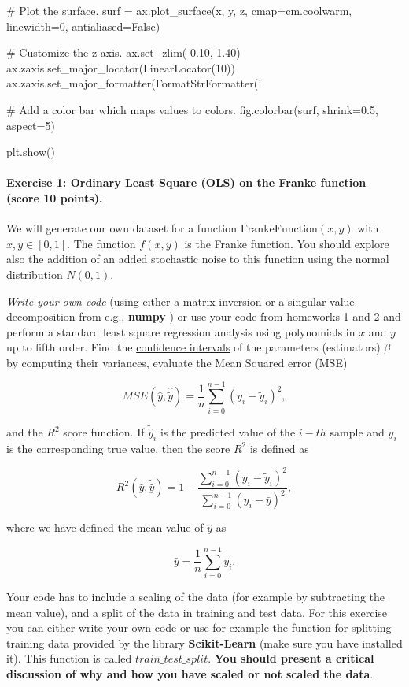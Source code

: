 \documentclass[%
oneside,                 %
final,                   %
10pt]{article}
\begin{document}
# Plot the surface.
surf = ax.plot_surface(x, y, z, cmap=cm.coolwarm,
                       linewidth=0, antialiased=False)

# Customize the z axis.
ax.set_zlim(-0.10, 1.40)
ax.zaxis.set_major_locator(LinearLocator(10))
ax.zaxis.set_major_formatter(FormatStrFormatter('%

# Add a color bar which maps values to colors.
fig.colorbar(surf, shrink=0.5, aspect=5)

plt.show()

\epycod


\paragraph{Exercise 1: Ordinary Least Square (OLS) on the Franke function (score 10 points).}
We will generate our own dataset for a function
$\mathrm{FrankeFunction}(x,y)$ with $x,y \in [0,1]$. The function
$f(x,y)$ is the Franke function. You should explore also the addition
of an added stochastic noise to this function using the normal
distribution $N(0,1)$.

\emph{Write your own code} (using either a matrix inversion or a singular
value decomposition from e.g., \textbf{numpy} ) or use your code from
homeworks 1 and 2 and perform a standard least square regression
analysis using polynomials in $x$ and $y$ up to fifth order. Find the
\href{{https://en.wikipedia.org/wiki/Confidence_interval}}{confidence intervals} of the parameters (estimators) $\beta$ by computing their
variances, evaluate the Mean Squared error (MSE)

\[ MSE(\hat{y},\hat{\tilde{y}}) = \frac{1}{n}
\sum_{i=0}^{n-1}(y_i-\tilde{y}_i)^2, 
\] 

and the $R^2$ score function.  If $\tilde{\hat{y}}_i$ is the predicted
value of the $i-th$ sample and $y_i$ is the corresponding true value,
then the score $R^2$ is defined as

\[
R^2(\hat{y}, \tilde{\hat{y}}) = 1 - \frac{\sum_{i=0}^{n - 1} (y_i - \tilde{y}_i)^2}{\sum_{i=0}^{n - 1} (y_i - \bar{y})^2},
\]

where we have defined the mean value  of $\hat{y}$ as

\[
\bar{y} =  \frac{1}{n} \sum_{i=0}^{n - 1} y_i.
\]

Your code has to include a scaling of the data (for example by
subtracting the mean value), and
a split of the data in training and test data. For this exercise you can
either write your own code or use for example the function for
splitting training data provided by the library \textbf{Scikit-Learn} (make
sure you have installed it).  This function is called
$train\_test\_split$.  \textbf{You should present a critical discussion of why and how you have scaled or not scaled the data}.
\end{document}
